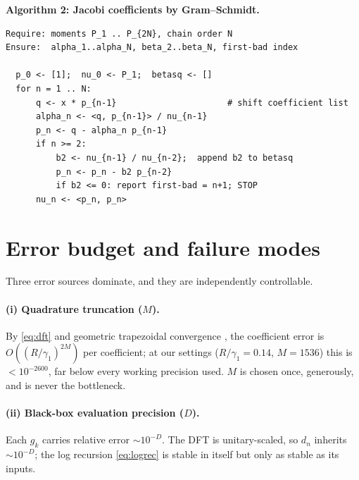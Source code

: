 \documentclass[11pt]{article}
\theoremstyle{definition}
\begin{document}
\noindent\textbf{Algorithm 2: Jacobi coefficients by Gram--Schmidt.}\par\smallskip
\begin{lstlisting}
Require: moments P_1 .. P_{2N}, chain order N
Ensure:  alpha_1..alpha_N, beta_2..beta_N, first-bad index

  p_0 <- [1];  nu_0 <- P_1;  betasq <- []
  for n = 1 .. N:
      q <- x * p_{n-1}                      # shift coefficient list
      alpha_n <- <q, p_{n-1}> / nu_{n-1}
      p_n <- q - alpha_n p_{n-1}
      if n >= 2:
          b2 <- nu_{n-1} / nu_{n-2};  append b2 to betasq
          p_n <- p_n - b2 p_{n-2}
          if b2 <= 0: report first-bad = n+1; STOP
      nu_n <- <p_n, p_n>
\end{lstlisting}

\section{Error budget and failure modes}\label{sec:budget}

Three error sources dominate, and they are independently controllable.

\paragraph{(i) Quadrature truncation ($M$).}
By \eqref{eq:dft} and geometric trapezoidal convergence
\cite{Trefethen2014}, the coefficient error is
$O((R/\gamma_1)^{2M})$ per coefficient; at our settings
($R/\gamma_1=0.14$, $M=1536$) this is $<10^{-2600}$, far below every
working precision used. $M$ is chosen once, generously, and is never
the bottleneck.

\paragraph{(ii) Black-box evaluation precision ($D$).}
Each $g_k$ carries relative error $\sim 10^{-D}$. The DFT is
unitary-scaled, so $d_n$ inherits $\sim 10^{-D}$; the log recursion
\eqref{eq:logrec} is stable in itself but only as stable as its
inputs.
\end{document}
